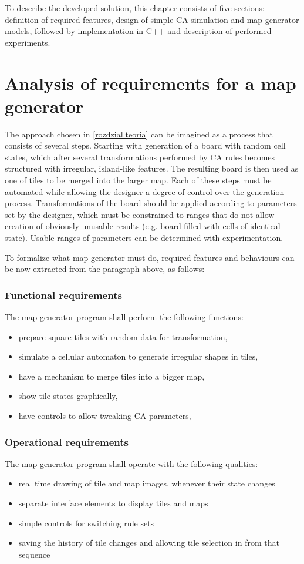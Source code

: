 \documentclass[12pt]{report}
\begin{document}
To describe the developed solution, this chapter consists of five sections: definition of required features, design of simple CA simulation and map generator models, followed by implementation in C++ and description of performed experiments. 

\section{Analysis of requirements for a map generator}

The approach chosen in \cref{rozdzial.teoria} can be imagined as a process that consists of several steps. Starting with generation of a board with random cell states, which after several transformations performed by CA rules becomes structured with irregular, island-like features. The resulting board is then used as one of tiles to be merged into the larger map. Each of these steps must be automated while allowing the designer a degree of control over the generation process. Transformations of the board should be applied according to parameters set by the designer, which must be constrained to ranges that do not allow creation of obviously unusable results (e.g. board filled with cells of identical state). Usable ranges of parameters can be determined with experimentation. 

To formalize what map generator must do, required features and behaviours can be now extracted from the paragraph above, as follows:
 
\subsubsection{Functional requirements}

The map generator program shall perform the following functions:
\begin{itemize}
	\item prepare square tiles with random data for transformation,
	\item simulate a cellular automaton to generate irregular shapes in tiles,
	\item have a mechanism to merge tiles into a bigger map,
	\item show tile states graphically,
	\item have controls to allow tweaking CA parameters,
\end{itemize} 


\subsubsection{Operational requirements}
The map generator program shall operate with the following qualities:
\begin{itemize}
	\item real time drawing of tile and map images, whenever their state changes  
	\item separate interface elements to display tiles and maps
	\item simple controls for switching rule sets
	\item saving the history of tile changes and allowing tile selection in from that sequence
\end{itemize}
\end{document}
